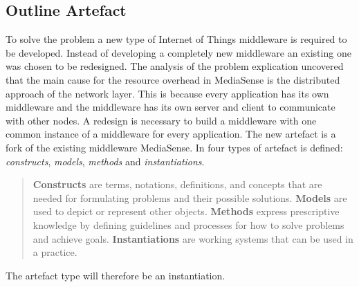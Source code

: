 \subsection{Outline Artefact}
To solve the problem a new type of Internet of Things middleware is required to be developed. Instead of developing a completely new middleware an existing one was chosen to be redesigned. The analysis of the problem explication uncovered that the main cause for the resource overhead in MediaSense is the distributed approach of the network layer. This is because every application has its own middleware and the middleware has its own server and client to communicate with other nodes. A redesign is necessary to build a middleware with one common instance of a middleware for every application. The new artefact is a fork of the existing middleware MediaSense. In \cite{johannesson2012design} four types of artefact is defined: \emph{constructs}, \emph{models}, \emph{methods} and \emph{instantiations}. 

\begin{quotation}
  \textbf{Constructs} are terms, notations, definitions, and concepts that are needed for formulating problems and their possible solutions.
  \textbf{Models} are used to depict or represent other objects.
  \textbf{Methods} express prescriptive knowledge by defining guidelines and processes for how to solve problems and achieve goals.
  \textbf{Instantiations} are working systems that can be used in a practice.
\end{quotation}
The artefact type will therefore be an instantiation.
